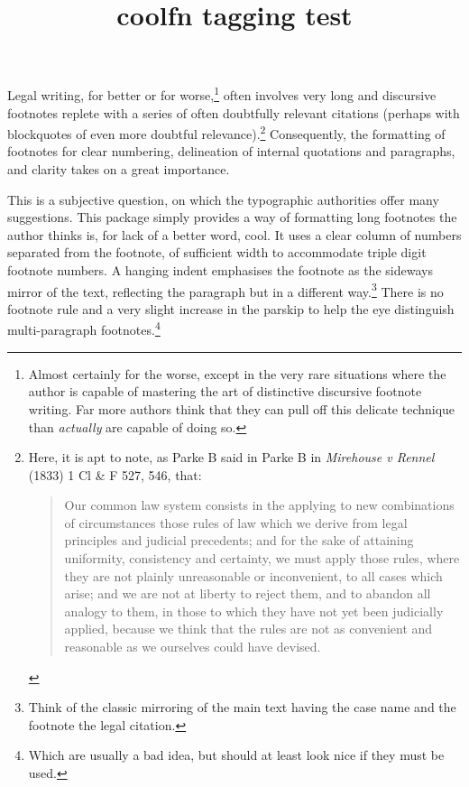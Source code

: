 \documentclass{article}
\title{coolfn tagging test}
\begin{document}
Legal writing, for better or for worse,\footnote{Almost certainly for the worse, except in the very rare situations where the author is capable of mastering the art of distinctive discursive footnote writing.  Far more authors think that they can pull off this delicate technique than \textit{actually} are capable of doing so. } often involves very long and discursive footnotes replete with a series of often doubtfully relevant citations (perhaps with blockquotes of  even more doubtful relevance).\footnote{Here, it is apt to note, as Parke \textsc{B} said in Parke B in \textit{Mirehouse v Rennel} (1833) 1 Cl \& F 527, 546, that:
\begin{quote}
Our common law system consists in the applying to new combinations of circumstances those rules of law which we derive from legal principles and judicial precedents; and for the sake of attaining uniformity, consistency and certainty, we must apply those rules, where they are not plainly unreasonable or inconvenient, to all cases which arise; and we are not at liberty to reject them, and to abandon all analogy to them, in those to which they have not yet been judicially applied, because we think that the rules are not as convenient and reasonable as we ourselves could have devised.\end{quote}} Consequently, the formatting of footnotes for clear numbering, delineation of internal quotations and paragraphs, and clarity takes on a great importance.

This is a subjective question, on which the typographic authorities offer many suggestions. This package simply provides a way of formatting long footnotes the author thinks is, for lack of a better word, cool. It uses a clear column of numbers separated from the footnote, of sufficient width to accommodate triple digit footnote numbers.  A hanging indent emphasises the footnote as the sideways mirror of the text, reflecting the paragraph but in a different way.\footnote{Think of the classic mirroring of the main text having the case name and the footnote the legal citation.} There is no footnote rule and a very slight increase in the parskip to help the eye distinguish multi-paragraph footnotes.\footnote{Which are usually a bad idea, but should at least look nice if they must be used.}
\end{document}
